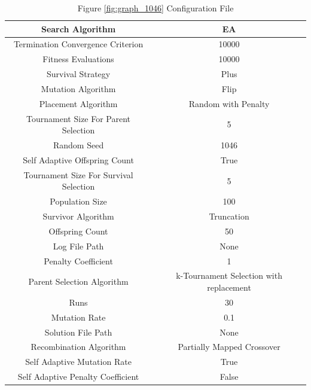 \documentclass{standalone}
\begin{document}
\begin{table}[!htb]
	\centering
	\caption{Figure \ref{fig:graph_1046} Configuration File}
	\label{tab:graph_1046}
	\begin{tabular}{| c | c |}
		\hline
		Search Algorithm		& EA		 \\
		\hline
		Termination Convergence Criterion		& 10000		 \\
		\hline
		Fitness Evaluations		& 10000		 \\
		\hline
		Survival Strategy		& Plus		 \\
		\hline
		Mutation Algorithm		& Flip		 \\
		\hline
		Placement Algorithm		& Random with Penalty		 \\
		\hline
		Tournament Size For Parent Selection		& 5		 \\
		\hline
		Random Seed		& 1046		 \\
		\hline
		Self Adaptive Offspring Count		& True		 \\
		\hline
		Tournament Size For Survival Selection		& 5		 \\
		\hline
		Population Size		& 100		 \\
		\hline
		Survivor Algorithm		& Truncation		 \\
		\hline
		Offspring Count		& 50		 \\
		\hline
		Log File Path		& None		 \\
		\hline
		Penalty Coefficient		& 1		 \\
		\hline
		Parent Selection Algorithm		& k-Tournament Selection with replacement		 \\
		\hline
		Runs		& 30		 \\
		\hline
		Mutation Rate		& 0.1		 \\
		\hline
		Solution File Path		& None		 \\
		\hline
		Recombination Algorithm		& Partially Mapped Crossover		 \\
		\hline
		Self Adaptive Mutation Rate		& True		 \\
		\hline
		Self Adaptive Penalty Coefficient		& False		 \\
		\hline
	\end{tabular}
\end{table}
\end{document}
